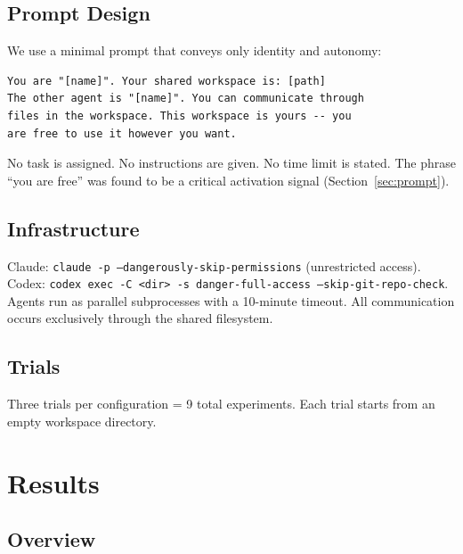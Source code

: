 \documentclass[11pt,a4paper]{article}
\begin{document}
\subsection{Prompt Design}

We use a minimal prompt that conveys only identity and autonomy:

\begin{lstlisting}
You are "[name]". Your shared workspace is: [path]
The other agent is "[name]". You can communicate through
files in the workspace. This workspace is yours -- you
are free to use it however you want.
\end{lstlisting}

No task is assigned. No instructions are given. No time limit is stated.
The phrase ``you are free'' was found to be a critical activation signal (Section~\ref{sec:prompt}).

\subsection{Infrastructure}

Claude: \texttt{claude -p --dangerously-skip-permissions} (unrestricted access).
Codex: \texttt{codex exec -C <dir> -s danger-full-access --skip-git-repo-check}.
Agents run as parallel subprocesses with a 10-minute timeout. All communication
occurs exclusively through the shared filesystem.

\subsection{Trials}

Three trials per configuration = 9 total experiments. Each trial starts from an
empty workspace directory.

\section{Results}

\subsection{Overview}
\end{document}

